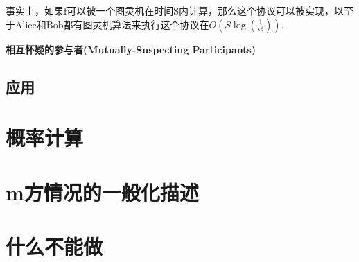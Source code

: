 \documentclass[]{article}
\begin{document}
	事实上，如果f可以被一个图灵机在时间S内计算，那么这个协议可以被实现，以至于Alice和Bob都有图灵机算法来执行这个协议在$O(S\log(\frac{1}{\epsilon \delta}))$.
	\par
	
	\textbf{相互怀疑的参与者(Mutually-Suspecting Participants)}\par
	
	\subsection{应用}
	
	\section{概率计算}
	
	\section{m方情况的一般化描述}
	
	\section{什么不能做}
	
	
\end{document}
